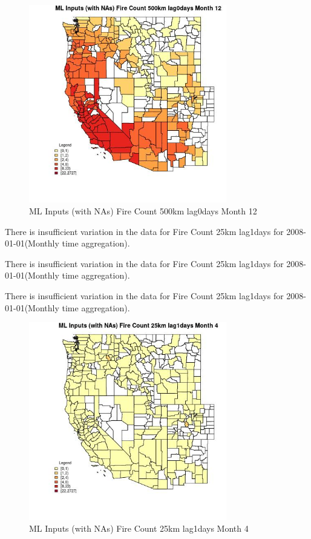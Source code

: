 \begin{figure} 
\centering  
\includegraphics[width=0.77\textwidth]{Code_Outputs/Report_ML_input_PM25_Step4_part_f_de_duplicated_aveswNAs_CountyFire_Count_500km_lag0daysmedianMonth12.jpg} 
\caption{\label{fig:Report_ML_input_PM25_Step4_part_f_de_duplicated_aveswNAsCountyFire_Count_500km_lag0daysmedianMonth12}ML Inputs (with NAs) Fire Count 500km lag0days Month 12} 
\end{figure} 
 

There is insufficient variation in the data for Fire Count 25km lag1days for 2008-01-01(Monthly time aggregation). 
 

There is insufficient variation in the data for Fire Count 25km lag1days for 2008-01-01(Monthly time aggregation). 
 

There is insufficient variation in the data for Fire Count 25km lag1days for 2008-01-01(Monthly time aggregation). 
 

\begin{figure} 
\centering  
\includegraphics[width=0.77\textwidth]{Code_Outputs/Report_ML_input_PM25_Step4_part_f_de_duplicated_aveswNAs_CountyFire_Count_25km_lag1daysmedianMonth4.jpg} 
\caption{\label{fig:Report_ML_input_PM25_Step4_part_f_de_duplicated_aveswNAsCountyFire_Count_25km_lag1daysmedianMonth4}ML Inputs (with NAs) Fire Count 25km lag1days Month 4} 
\end{figure} 
 

